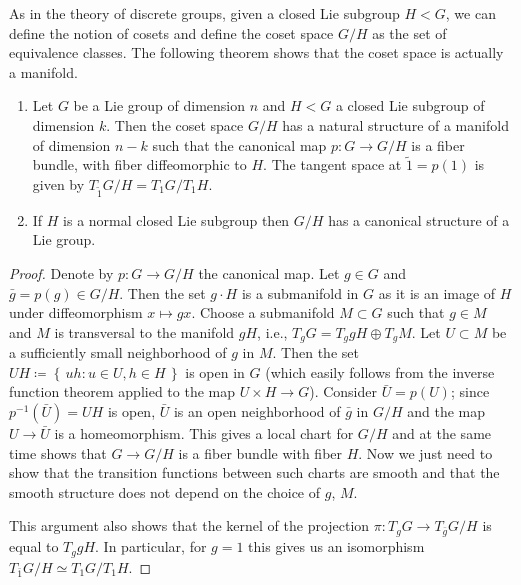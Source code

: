 As in the theory of discrete groups, given a closed Lie subgroup $H<G$, we
can define the notion of cosets and define the coset space $G/H$ as the set
of equivalence classes. The following theorem shows that the coset space is
actually a manifold.
\begin{theorem}
  \hfill
  \begin{enumerate}[label=\textnormal{(\arabic*)}]
  \item Let $G$ be a Lie group of dimension $n$ and $H<G$ a closed Lie
    subgroup of dimension $k$. Then the coset space $G/H$ has a natural
    structure of a manifold of dimension $n-k$ such that the canonical map
    $p\colon G\to G/H$ is a fiber bundle, with fiber diffeomorphic to
    $H$. The tangent space at $\tilde 1=p(1)$ is given by $T_{\tilde
      1}G/H=T_1G/T_1H$.
  \item If $H$ is a normal closed Lie subgroup then $G/H$ has a canonical
    structure of a Lie group.
  \end{enumerate}
\end{theorem}
\begin{proof}
  Denote by $p\colon G\to G/H$ the canonical map. Let $g\in G$ and
  $\bar g=p(g)\in G/H$. Then the set $g\cdot H$ is a submanifold in $G$ as
  it is an image of $H$ under diffeomorphism $x\mapsto gx$. Choose a
  submanifold $M\subset G$ such that $g\in M$ and $M$ is transversal to the
  manifold $gH$, i.e., $T_gG=T_ggH\oplus T_gM$. Let $U\subset M$ be a
  sufficiently small neighborhood of $g$ in $M$. Then the set
  $UH\coloneq\left\{\,uh:u\in U,h\in H\,\right\}$ is open in $G$ (which
  easily follows from the inverse function theorem applied to the map
  $U\times H\to G$). Consider $\bar U=p(U)$; since $p^{-1}(\bar U)=UH$ is
  open, $\bar U$ is an open neighborhood of $\bar g$ in $G/H$ and the map
  $U\to \bar U$ is a homeomorphism. This gives a local chart for $G/H$ and
  at the same time shows that $G\to G/H$ is a fiber bundle with fiber
  $H$. Now we just need to show that the transition functions between such
  charts are smooth and that the smooth structure does not depend on the
  choice of $g$, $M$.

  This argument also shows that the kernel of the projection $\pi\colon
  T_gG\to T_{\bar g}G/H$ is equal to $T_ggH$. In particular, for $g=1$ this
  gives us an isomorphism $T_{\bar 1}G/H\simeq T_1G/T_1H$.
\end{proof}


